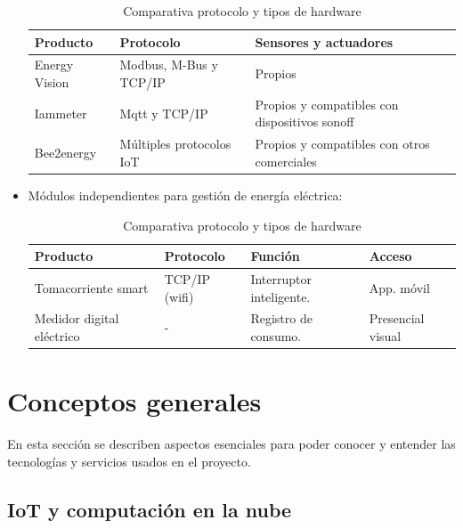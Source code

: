 \begin{itemize}
\begin{table}[h]
	\centering
	\caption[Comparativa de soluciones entre protocolo y hardware]{Comparativa protocolo y tipos de hardware}
	\begin{tabular}{l p{5cm} p{5cm}}    
		\toprule
		\textbf{Producto} 	 & \textbf{Protocolo}  & \textbf{Sensores y actuadores}  \\
		\midrule
		Energy Vision & Modbus, M-Bus  y TCP/IP 	& Propios \\		
		Iammeter	 & Mqtt y TCP/IP	& Propios y compatibles con       dispositivos sonoff   \\
		Bee2energy	 & Múltiples protocolos IoT		& Propios y compatibles con otros comerciales  \\
		\bottomrule
		\hline
	\end{tabular}
	\label{tab:tabla3}
\end{table}


\item Módulos independientes para gestión de energía eléctrica:


\begin{table}[h]
	\centering
	\caption[Comparativa de módulos entre protocolo y hardware]{Comparativa protocolo y tipos de hardware}
	\begin{tabular}{l p{2cm} p{3cm} p{2cm}}    
		\toprule
		\textbf{Producto} 	 & \textbf{Protocolo}  & \textbf{Función} & \textbf{Acceso} \\
		\midrule
		Tomacorriente smart & TCP/IP (wifi)	& Interruptor inteligente. & App. móvil  \\		
		Medidor digital eléctrico	 & -	& Registro de consumo.  & Presencial visual \\
		
		\bottomrule
		\hline
	\end{tabular}
	\label{tab:tabla4}
\end{table}



\end{itemize}

\section{Conceptos generales}

En esta sección se describen aspectos esenciales para poder conocer y entender las tecnologías y servicios usados en el proyecto.

\subsection{IoT y computación en la nube}


